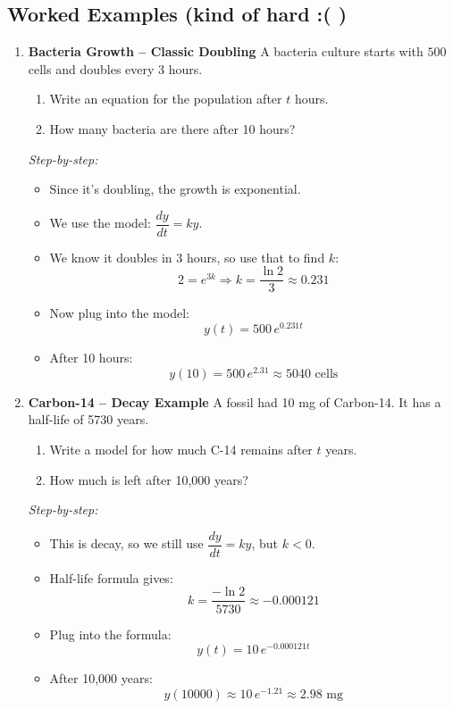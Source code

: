 \documentclass{article}
\begin{document}
\subsection*{Worked Examples (kind of hard :(  )}
\begin{enumerate}
\item \textbf{Bacteria Growth – Classic Doubling}
A bacteria culture starts with \(500\) cells and doubles every 3 hours.

\begin{enumerate}[label=\alph*)]
  \item Write an equation for the population after \(t\) hours.
  \item How many bacteria are there after 10 hours?
\end{enumerate}

\textit{Step-by-step:}
\begin{itemize}
  \item Since it’s doubling, the growth is exponential.
  \item We use the model: \(\dfrac{dy}{dt} = k y\).
  \item We know it doubles in 3 hours, so use that to find \(k\):  
  \[
  2 = e^{3k} \Rightarrow k = \frac{\ln 2}{3} \approx 0.231
  \]
  \item Now plug into the model:  
  \[
  \boxed{y(t) = 500\,e^{0.231t}}
  \]
  \item After 10 hours:
  \[
  y(10) = 500\,e^{2.31} \approx 5040 \text{ cells}
  \]
\end{itemize}

\bigskip
\item \textbf{Carbon-14 – Decay Example}
A fossil had 10 mg of Carbon-14. It has a half-life of 5730 years.

\begin{enumerate}[label=\alph*)]
  \item Write a model for how much C-14 remains after \(t\) years.
  \item How much is left after 10,000 years?
\end{enumerate}

\textit{Step-by-step:}
\begin{itemize}
  \item This is decay, so we still use \(\dfrac{dy}{dt} = k y\), but \(k < 0\).
  \item Half-life formula gives:  
  \[
  k = \frac{-\ln 2}{5730} \approx -0.000121
  \]
  \item Plug into the formula:  
  \[
  \boxed{y(t) = 10\,e^{-0.000121t}}
  \]
  \item After 10,000 years:
  \[
  y(10000) \approx 10\,e^{-1.21} \approx 2.98 \text{ mg}
  \]
\end{itemize}


\end{enumerate}
\end{document}
